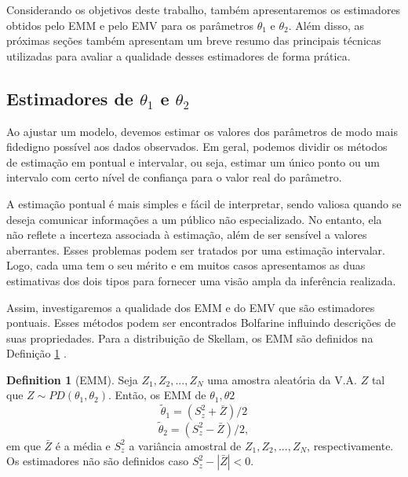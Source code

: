 \documentclass[12pt]{article}
\theoremstyle{definition}
\newtheorem{definition}{Definition}[section]
\begin{document}
Considerando os objetivos deste trabalho, também apresentaremos os estimadores obtidos pelo EMM e pelo EMV para os parâmetros $\theta_1$ e $\theta_2$. Além disso, as próximas seções também apresentam um breve resumo das principais técnicas utilizadas para avaliar a qualidade desses estimadores de forma prática.


\subsection{Estimadores de $\theta_1$ e $\theta_2$}

Ao ajustar um modelo, devemos estimar os valores dos parâmetros de modo mais fidedigno possível aos dados observados. Em geral, podemos dividir os métodos de estimação em pontual e intervalar, ou seja, estimar um único ponto ou um intervalo com certo nível de confiança para o valor real do parâmetro.

A estimação pontual é mais simples e fácil de interpretar, sendo valiosa quando se deseja comunicar informações a um público não especializado. No entanto, ela não reflete a incerteza associada à estimação, além de ser sensível a valores aberrantes. Esses problemas podem ser tratados por uma estimação intervalar. Logo, cada uma tem o seu mérito e em muitos casos apresentamos as duas estimativas dos dois tipos para fornecer uma visão ampla da inferência realizada.

Assim, investigaremos a qualidade dos EMM e do EMV que são estimadores pontuais. Esses métodos podem ser encontrados Bolfarine \cite{bolfarine2010} influindo descrições de suas propriedades. Para a distribuição de Skellam, os EMM são definidos na Definição \ref{def:emm} \cite{karlis2008}.

\begin{definition}[EMM]
    \label{def:emm}
    Seja $Z_1, Z_2, ..., Z_N$ uma amostra aleatória da V.A. $Z$ tal que $Z \sim PD(\theta_1, \theta_2)$. Então, os EMM de $\theta_1, \theta2$
    \begin{equation*}
    \tilde \theta_1 =  (S_z^2 + \bar{Z}) /2
    \end{equation*}
     \begin{equation*}
    \tilde \theta_2 =  (S_z^2 - \bar{Z}) /2,
    \end{equation*}
    em que $\bar{Z}$ é a média e $S_z^2$ a variância amostral de $Z_1, Z_2, ..., Z_N$, respectivamente. Os estimadores não são definidos caso $S_z^2 - |\bar{Z}| < 0$.
\end{definition}
\end{document}
